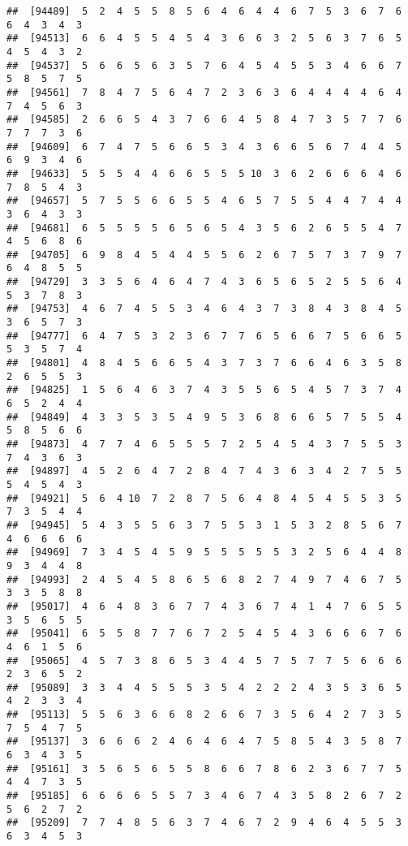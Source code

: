 \documentclass[
]{book}
\begin{document}
\begin{verbatim}
##  [94489]  5  2  4  5  5  8  5  6  4  6  4  4  6  7  5  3  6  7  6  6  4  3  4  3
##  [94513]  6  6  4  5  5  4  5  4  3  6  6  3  2  5  6  3  7  6  5  4  5  4  3  2
##  [94537]  5  6  6  5  6  3  5  7  6  4  5  4  5  5  3  4  6  6  7  5  8  5  7  5
##  [94561]  7  8  4  7  5  6  4  7  2  3  6  3  6  4  4  4  4  6  4  7  4  5  6  3
##  [94585]  2  6  6  5  4  3  7  6  6  4  5  8  4  7  3  5  7  7  6  7  7  7  3  6
##  [94609]  6  7  4  7  5  6  6  5  3  4  3  6  6  5  6  7  4  4  5  6  9  3  4  6
##  [94633]  5  5  5  4  4  6  6  5  5  5 10  3  6  2  6  6  6  4  6  7  8  5  4  3
##  [94657]  5  7  5  5  6  6  5  5  4  6  5  7  5  5  4  4  7  4  4  3  6  4  3  3
##  [94681]  6  5  5  5  5  6  5  6  5  4  3  5  6  2  6  5  5  4  7  4  5  6  8  6
##  [94705]  6  9  8  4  5  4  4  5  5  6  2  6  7  5  7  3  7  9  7  6  4  8  5  5
##  [94729]  3  3  5  6  4  6  4  7  4  3  6  5  6  5  2  5  5  6  4  5  3  7  8  3
##  [94753]  4  6  7  4  5  5  3  4  6  4  3  7  3  8  4  3  8  4  5  3  6  5  7  3
##  [94777]  6  4  7  5  3  2  3  6  7  7  6  5  6  6  7  5  6  6  5  5  3  5  7  4
##  [94801]  4  8  4  5  6  6  5  4  3  7  3  7  6  6  4  6  3  5  8  2  6  5  5  3
##  [94825]  1  5  6  4  6  3  7  4  3  5  5  6  5  4  5  7  3  7  4  6  5  2  4  4
##  [94849]  4  3  3  5  3  5  4  9  5  3  6  8  6  6  5  7  5  5  4  5  8  5  6  6
##  [94873]  4  7  7  4  6  5  5  5  7  2  5  4  5  4  3  7  5  5  3  7  4  3  6  3
##  [94897]  4  5  2  6  4  7  2  8  4  7  4  3  6  3  4  2  7  5  5  5  4  5  4  3
##  [94921]  5  6  4 10  7  2  8  7  5  6  4  8  4  5  4  5  5  3  5  7  3  5  4  4
##  [94945]  5  4  3  5  5  6  3  7  5  5  3  1  5  3  2  8  5  6  7  4  6  6  6  6
##  [94969]  7  3  4  5  4  5  9  5  5  5  5  5  3  2  5  6  4  4  8  9  3  4  4  8
##  [94993]  2  4  5  4  5  8  6  5  6  8  2  7  4  9  7  4  6  7  5  3  3  5  8  8
##  [95017]  4  6  4  8  3  6  7  7  4  3  6  7  4  1  4  7  6  5  5  3  5  6  5  5
##  [95041]  6  5  5  8  7  7  6  7  2  5  4  5  4  3  6  6  6  7  6  4  6  1  5  6
##  [95065]  4  5  7  3  8  6  5  3  4  4  5  7  5  7  7  5  6  6  6  2  3  6  5  2
##  [95089]  3  3  4  4  5  5  5  3  5  4  2  2  2  4  3  5  3  6  5  4  2  3  3  4
##  [95113]  5  5  6  3  6  6  8  2  6  6  7  3  5  6  4  2  7  3  5  7  5  4  7  5
##  [95137]  3  6  6  6  2  4  6  4  6  4  7  5  8  5  4  3  5  8  7  6  3  4  3  5
##  [95161]  3  5  6  5  6  5  5  8  6  6  7  8  6  2  3  6  7  7  5  4  4  7  3  5
##  [95185]  6  6  6  6  5  5  7  3  4  6  7  4  3  5  8  2  6  7  2  5  6  2  7  2
##  [95209]  7  7  4  8  5  6  3  7  4  6  7  2  9  4  6  4  5  5  3  6  3  4  5  3

\end{verbatim}
\end{document}
